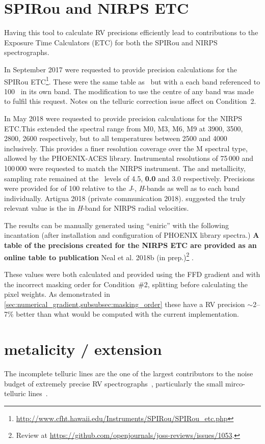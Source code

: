 \clearpage


\section{{SPIRou} and {NIRPS} {ETC}}\label{sec:spirou_nirps_etc}
Having this tool to calculate {RV} precisions efficiently lead to contributions to the Exposure Time Calculators (ETC) for both the {SPIRou} and {NIRPS} spectrographs.

In September 2017  were requested to provide precision calculations for the {SPIRou} ETC\footnote{\url{http://www.cfht.hawaii.edu/Instruments/SPIRou/SPIRou_etc.php}}.
These were the same table as~\citet{figueira_radial_2016} but with a each band referenced to 100~{\snr{}} in its own band.
The modification to use the centre of any band was made to fulfil this request.
Notes on the telluric correction issue affect on Condition~2.

In May 2018  were requested to provide precision calculations for the {NIRPS} {ETC}.\@ This extended the spectral range from {M0}, {M3}, {M6}, {M9} at 3900, 3500, 2800, 2600\K{} respectively, but to all temperatures between 2500 and 4000\K{} inclusively.
This provides a finer resolution coverage over the M spectral type, allowed by the {PHOENIX-ACES} library.
Instrumental resolutions of 75\,000 and 100\,000 were requested to match the {NIRPS} instrument.
The \Logg{} and metallicity, sampling rate remained at the~\citet{figueira_radial_2016} levels of 4.5, \textbf{0.0} and 3.0 respectively.\todo{}
Precisions were provided for \snr{} of 100 relative to the \emph{J}-, \emph{H}-bands as well as to each band individually.
Artigua 2018 (private communication 2018).  suggested the truly relevant value is the \snr{} in \emph{H}-band for {NIRPS} radial velocities.

The results can be manually generated using ``eniric'' with the following incantation (after installation and configuration of {PHOENIX} library spectra.)
\textbf{A table of the precisions created for the {NIRPS} ETC are provided as an online table to  publication} {Neal et al.
    2018b (in prep.)}\footnote{Review at \href{https://github.com/openjournals/joss-reviews/issues/1053}{https://github.com/openjournals/joss-reviews/issues/1053}.} .


These values were both calculated and provided using the {FFD} gradient and with the incorrect masking order for Condition~\#2, splitting before calculating the pixel weights.
As  demonstrated in \cref{sec:numerical_gradient,subsubsec:masking_order} these have a {RV} precision \(\sim\)2--7\% better than what would be computed with the current implementation.


\section{ metalicity / \Logg{} extension}




The incomplete telluric lines are the one of the largest contributors to the noise budget of extremely precise {RV} spectrographs~\citep{halverson_comprehensive_2016}, particularly the small mirco-telluric lines~\citep{cunha_impact_2014}.